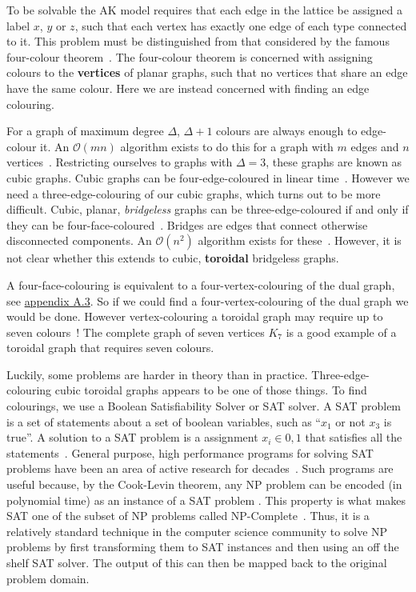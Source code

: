 To be solvable the AK model requires that each edge in the lattice be assigned a label \(x\), \(y\) or \(z\), such that each vertex has exactly one edge of each type connected to it. This problem must be distinguished from that considered by the famous four-colour theorem~\autocite{appelEveryPlanarMap1989}. The four-colour theorem is concerned with assigning colours to the \textbf{vertices} of planar graphs, such that no vertices that share an edge have the same colour. Here we are instead concerned with finding an edge colouring.

For a graph of maximum degree \(\Delta\), \(\Delta + 1\) colours are always enough to edge-colour it. An \(\mathcal{O}(mn)\) algorithm exists to do this for a graph with \(m\) edges and \(n\) vertices~\autocite{gEstimateChromaticClass1964}. Restricting ourselves to graphs with \(\Delta = 3\), these graphs are known as cubic graphs. Cubic graphs can be four-edge-coloured in linear time~\autocite{skulrattanakulchai4edgecoloringGraphsMaximum2002}. However we need a three-edge-colouring of our cubic graphs, which turns out to be more difficult. Cubic, planar, \emph{bridgeless} graphs can be three-edge-coloured if and only if they can be four-face-coloured~\autocite{tait1880remarks}. Bridges are edges that connect otherwise disconnected components. An \(\mathcal{O}(n^2)\) algorithm exists for these~\autocite{robertson1996efficiently}. However, it is not clear whether this extends to cubic, \textbf{toroidal} bridgeless graphs.

A four-face-colouring is equivalent to a four-vertex-colouring of the dual graph, see \protect\hyperlink{app-lattice-generation}{appendix A.3}. So if we could find a four-vertex-colouring of the dual graph we would be done. However vertex-colouring a toroidal graph may require up to seven colours~\autocite{heawoodMapColouringTheorems}! The complete graph of seven vertices \(K_7\) is a good example of a toroidal graph that requires seven colours.

Luckily, some problems are harder in theory than in practice. Three-edge-colouring cubic toroidal graphs appears to be one of those things. To find colourings, we use a Boolean Satisfiability Solver or SAT solver. A SAT problem is a set of statements about a set of boolean variables, such as ``\(x_1\) or not \(x_3\) is true''. A solution to a SAT problem is a assignment \(x_i \in {0,1}\) that satisfies all the statements~\autocite{Karp1972}. General purpose, high performance programs for solving SAT problems have been an area of active research for decades~\autocite{alounehComprehensiveStudyAnalysis2019}. Such programs are useful because, by the Cook-Levin theorem, any NP problem can be encoded (in polynomial time) as an instance of a SAT problem . This property is what makes SAT one of the subset of NP problems called NP-Complete~\autocite{cookComplexityTheoremprovingProcedures1971,levin1973universal}. Thus, it is a relatively standard technique in the computer science community to solve NP problems by first transforming them to SAT instances and then using an off the shelf SAT solver. The output of this can then be mapped back to the original problem domain.

